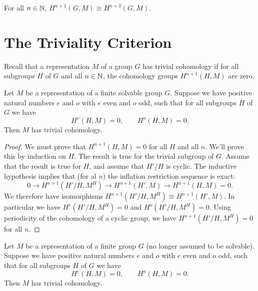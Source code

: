 \begin{corollary}
	For all $n \in {\mathbb N}$, $H^{n+1}(G,M) \cong H^{n+3}(G,M)$.
\end{corollary}







\section{The Triviality Criterion}

Recall that a representation $M$ of a group $G$ has trivial cohomology if for all subgroups $H$ of
$G$ and all $n \in {\mathbb N}$, the cohomology groups $H^{n+1}(H,M)$ are zero.

\begin{theorem}
	Let $M$ be a representation of a finite solvable group $G$.
	Suppose we have positive natural numbers $e$ and $o$ with $e$ even and $o$ odd,
	such that for all subgroups $H$ of $G$ we have
	\[
		H^e(H,M) = 0, \qquad H^o(H,M) = 0.
	\]
	Then $M$ has trivial cohomology.
\end{theorem}

\begin{proof}
	We must prove that $H^{n+1}(H,M) = 0$ for all $H$ and all $n$.
	We'll prove this by induction on $H$. The result is true for the trivial subgroup of $G$.
	Assume that the result is true for $H$, and assume that $H' / H$ is cyclic.
	The inductive hypothesis implies that (for al $n$) the inflation restriction sequence is exact:
	\[
		0 \to H^{n + 1} (H'/H, M^H) \to H^{n+1}(H' , M) \to H^{n+1}(H,M)= 0.
	\]
	We therefore have isomorphisms $H^{n + 1} (H'/H, M^H) \cong H^{n+1}(H' , M)$.
	In particular we have $H^{e} (H'/H, M^H) = 0$ and $H^{o} (H'/H, M^H) = 0$.
	Using periodicity of the cohomology of a cyclic group, we have $H^{n+1}(H'/H,M^H)=0$ for all $n$.
\end{proof}

\begin{theorem}
	Let $M$ be a representation of a finite group $G$ (no longer assumed to be solvable).
	Suppose we have positive natural numbers $e$ and $o$ with $e$ even and $o$ odd, such that for all subgroups $H$ of $G$ we have
	\[
		H^e(H,M) =0, \qquad H^o(H,M) = 0.
	\]
	Then $M$ has trivial cohomology.
\end{theorem}

